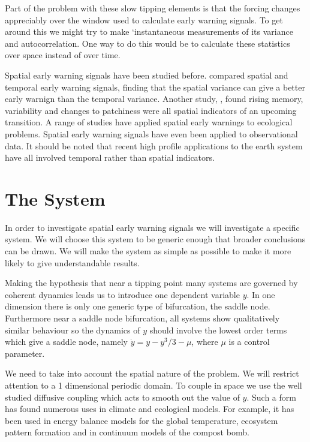 Part of the problem with these slow tipping elements is that the forcing changes appreciably over the window used to calculate early warning signals.
To get around this we might try to make `instantaneous measurements of its variance and autocorrelation. One way to do this would be to calculate these
statistics over space instead of over time.

Spatial early warning signals have been studied before. \cite{Donangelo2010} compared spatial and temporal early warning signals, finding that the spatial variance
can give a better early warnign than the temporal variance. Another study, \cite{Kefi2014}, found rising memory, variability and changes to patchiness were all
spatial indicators of an upcoming transition. A range of studies have applied spatial early warnings to ecological problems\cite{Carpenter2010,Dakos2011,Guttal2009}.
Spatial early warning signals have even been applied to observational data\cite{Tirabassi2023,Kefi2007,Eby2017}. It should be noted that recent high profile applications to
the earth system have all involved temporal rather than spatial indicators\cite{Boulton2022,Boers2021,Boers2021a}.

\section{The System}
In order to investigate spatial early warning signals we will investigate a specific system. We will choose this system
to be generic enough that broader conclusions can be drawn. We will make the system as simple as possible to make it more
likely to give understandable results.

Making the hypothesis that near a tipping point many systems are governed by coherent dynamics leads us to introduce one dependent
variable $y$. In one dimension there is only one generic type of bifurcation\cite{Thompson1994}, the saddle node. Furthermore
near a saddle node bifurcation, all systems show qualitatively similar behaviour\cite{guckenheimer2013} so the dynamics of $y$ should
involve the lowest order terms which give a saddle node, namely $\dot{y} = y - y^3/3 - \mu$, where $\mu$ is a control parameter.

We need to take into account the spatial nature of the problem. We will restrict attention to a 1 dimensional
periodic domain. To couple in space we use the well studied diffusive coupling which acts to smooth out the value of $y$.
Such a form has found numerous uses in climate and ecological models.
For example, it has been used in energy balance models for the global temperature\cite{Ghil1976}, ecosystem pattern formation\cite{Gowda2014}
and in continuum models of the compost bomb\cite{Clarke2021}.

